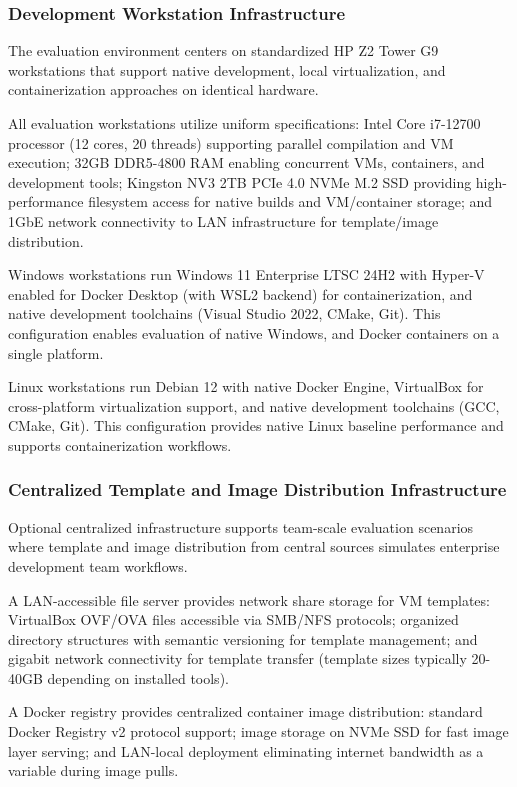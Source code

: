 \subsubsection{Development Workstation Infrastructure}

The evaluation environment centers on standardized HP Z2 Tower G9 workstations that support native development, local virtualization, and containerization approaches on identical hardware.

All evaluation workstations utilize uniform specifications: Intel Core i7-12700 processor (12 cores, 20 threads) supporting parallel compilation and VM execution; 32GB DDR5-4800 RAM enabling concurrent VMs, containers, and development tools; Kingston NV3 2TB PCIe 4.0 NVMe M.2 SSD providing high-performance filesystem access for native builds and VM/container storage; and 1GbE network connectivity to LAN infrastructure for template/image distribution.

Windows workstations run Windows 11 Enterprise LTSC 24H2 with Hyper-V enabled for Docker Desktop (with WSL2 backend) for containerization, and native development toolchains (Visual Studio 2022, CMake, Git).
This configuration enables evaluation of native Windows, and Docker containers on a single platform.

Linux workstations run Debian 12 with native Docker Engine, VirtualBox for cross-platform virtualization support, and native development toolchains (GCC, CMake, Git).
This configuration provides native Linux baseline performance and supports containerization workflows.

\subsubsection{Centralized Template and Image Distribution Infrastructure}

Optional centralized infrastructure supports team-scale evaluation scenarios where template and image distribution from central sources simulates enterprise development team workflows.

A LAN-accessible file server provides network share storage for VM templates: VirtualBox OVF/OVA files accessible via SMB/NFS protocols; organized directory structures with semantic versioning for template management; and gigabit network connectivity for template transfer (template sizes typically 20-40GB depending on installed tools).

A Docker registry provides centralized container image distribution: standard Docker Registry v2 protocol support; image storage on NVMe SSD for fast image layer serving; and LAN-local deployment eliminating internet bandwidth as a variable during image pulls.

